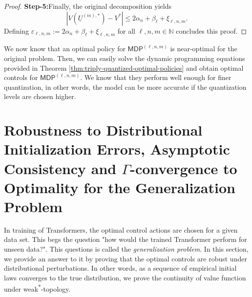 \documentclass[11pt]{article}
\newcommand{\NN}{\mathbb{N}}
\begin{document}
\begin{proof}
\noindent\textbf{Step-5:}Finally, the original decomposition yields
\begin{equation*}
    |V(\underline{U}^{(m),*}) - V^*| \leq 2\alpha_n + \beta_\ell + \xi_{\ell,n,m}.
\end{equation*}
Defining $\varepsilon_{\ell,n,m} := 2\alpha_n + \beta_\ell + \xi_{\ell,n,m}$ for all $\ell,n,m\in\NN$ concludes this proof.
\end{proof}

We now know that an optimal policy for $\mathsf{MDP}^{(\ell,n,m)}$ is near-optimal for the original problem. Then, we can easily solve the dynamic programming equations provided in Theorem \ref{thm:triply-quantized-optimal-policies} and obtain optimal controls for $\mathsf{MDP}^{(\ell,n,m)}$. We know that they perform well enough for finer quantization, in other words, the model can be more accurate if the quantization levels are chosen higher.

\section{Robustness to Distributional Initialization Errors, Asymptotic 
Consistency and $\Gamma$-convergence to Optimality for the Generalization Problem}\label{sec:robustness}
In training of Transformers, the optimal control actions are chosen for a given data set. This begs the question "how would the trained Transformer perform for unseen data?". This questions is called the \emph{generalization problem}. In this section, we provide an answer to it by proving that the optimal controls are robust under distributional perturbations. In other words, as a sequence of empirical initial laws converges to the true distribution, we prove the continuity of value function under weak\textsuperscript{$*$}-topology.
\end{document}

